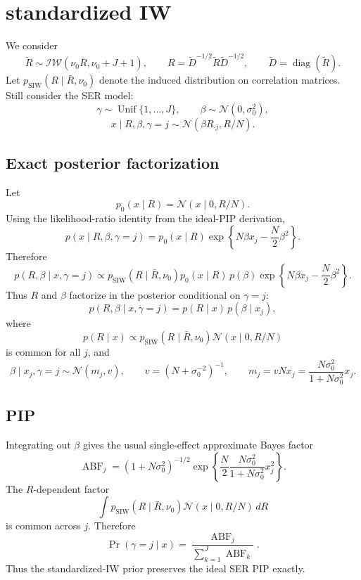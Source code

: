 \documentclass[11pt]{article}
\newcommand{\Rbar}{\bar R}
\newcommand{\Normal}{\mathcal N}
\newcommand{\Unif}{\operatorname{Unif}}
\newcommand{\diag}{\operatorname{diag}}
\begin{document}
\section{standardized IW}

We consider
\[
\tilde R \sim \mathcal{IW}(\nu_0 \Rbar,\nu_0+J+1),
\qquad
R=\tilde D^{-1/2}\tilde R\tilde D^{-1/2},
\qquad
\tilde D=\diag(\tilde R).
\]
Let \(p_{\mathrm{SIW}}(R\mid\Rbar,\nu_0)\) denote the induced distribution on
correlation matrices. Still consider the SER model:
\[
\gamma\sim\Unif\{1,\ldots,J\},
\qquad
\beta\sim\Normal(0,\sigma_0^2),
\]
\begin{equation}
x\mid R,\beta,\gamma=j
\sim
\Normal(\beta R_{\cdot j},R/N).
\end{equation}

\subsection*{Exact posterior factorization}

Let
\[
p_0(x\mid R)=\Normal(x\mid0,R/N).
\]
Using the likelihood-ratio identity from the ideal-PIP derivation,
\[
p(x\mid R,\beta,\gamma=j)
=
p_0(x\mid R)
\exp\left\{
N\beta x_j-\frac{N}{2}\beta^2
\right\}.
\]
Therefore
\[
p(R,\beta\mid x,\gamma=j)
\propto
p_{\mathrm{SIW}}(R\mid\Rbar,\nu_0)p_0(x\mid R)
\,
p(\beta)
\exp\left\{
N\beta x_j-\frac{N}{2}\beta^2
\right\}.
\]
Thus \(R\) and \(\beta\) factorize in the posterior conditional on
\(\gamma=j\):
\[
p(R,\beta\mid x,\gamma=j)
=
p(R\mid x)\,p(\beta\mid x_j),
\]
where
\[
p(R\mid x)
\propto
p_{\mathrm{SIW}}(R\mid\Rbar,\nu_0)
\Normal(x\mid0,R/N)
\]
is common for all \(j\), and
\[
\beta\mid x_j,\gamma=j
\sim
\Normal(m_j,v),
\qquad
v=(N+\sigma_0^{-2})^{-1},
\qquad
m_j=vNx_j
=
\frac{N\sigma_0^2}{1+N\sigma_0^2}x_j.
\]

\subsection*{PIP}

Integrating out \(\beta\) gives the usual single-effect approximate Bayes
factor
\[
\operatorname{ABF}_j
=
(1+N\sigma_0^2)^{-1/2}
\exp\left\{
\frac{N}{2}
\frac{N\sigma_0^2}{1+N\sigma_0^2}
x_j^2
\right\}.
\]
The \(R\)-dependent factor
\[
\int
p_{\mathrm{SIW}}(R\mid\Rbar,\nu_0)
\Normal(x\mid0,R/N)\,dR
\]
is common across \(j\). Therefore
\[
\Pr(\gamma=j\mid x)
=
\frac{\operatorname{ABF}_j}
{\sum_{k=1}^J\operatorname{ABF}_k}.
\]
Thus the standardized-IW prior preserves the ideal SER PIP exactly.
\end{document}
